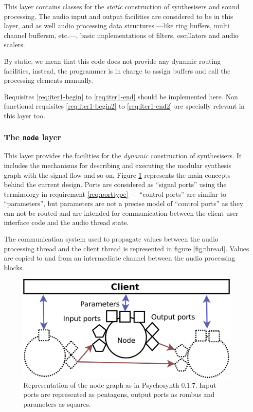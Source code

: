 This layer contains classes for the \emph{static} construction of
synthesisers and sound processing. The audio input and output
facilities are considered to be in this layer, and as well audio
processing data structures ---like ring buffers, multi channel
buffersm, etc.---, basic implementations of filters, oscillators and
audio scalers.

By static, we mean that this code does not provide any dynamic routing
facilities, instead, the programmer is in charge to assign buffers and
call the processing elements manually.

Requisites \ref{req:iter1-begin} to \ref{req:iter1-end} should be
implemented here. Non functional requisites \ref{req:iter1-begin2} to
\ref{req:iter1-end2} are specially relevant in this layer too.

\subsubsection{The \texttt{node} layer}

This layer provides the facilities for the \emph{dynamic} construction
of synthesisers. It includes the mechanisms for describing and
executing the modular synthesis graph with the signal flow and so
on. Figure \ref{fig:node} represents the main concepts behind the
current design. Ports are considered as ``signal ports'' using the
terminology in requirement \ref{req:porttype} --- ``control ports''
are similar to ``parameters'', but parameters are not a precise model
of ``control ports'' as they can not be routed and are intended for
communication between the client user interface code and the audio
thread state.

The communication system used to propagate values between the audio
processing thread and the client thread is represented in figure
\ref{fig:thread}. Values are copied to and from an intermediate channel
between the audio processing blocks. 

\begin{figure}[h]
\centering
\includegraphics[width=.6\textwidth]{pic/node.png}
\caption[Representation of the node graph as in Psychosynth
0.1.7]{Representation of the node graph as in Psychosynth 0.1.7. Input
ports are represented as pentagons, output ports as rombus and
parameters as squares.}
\label{fig:node}
\end{figure}

